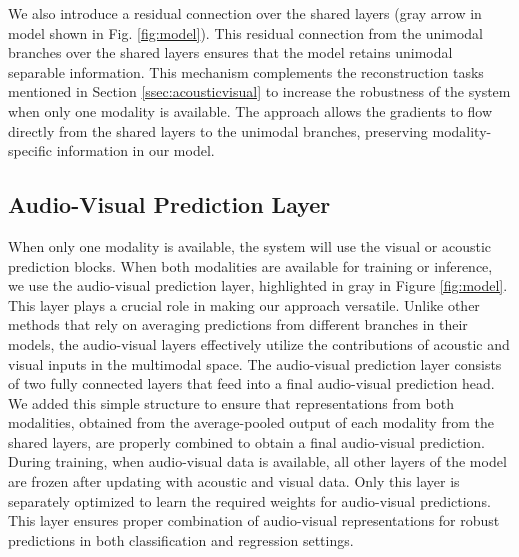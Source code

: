 \documentclass{article}
\begin{document}
We also introduce a residual connection over the shared layers (gray arrow in model  shown in Fig. \ref{fig:model}). This residual connection from the unimodal branches over the shared layers ensures that the model retains unimodal separable information. This mechanism complements the reconstruction tasks mentioned in Section \ref{ssec:acousticvisual} to increase the robustness of the system when only one modality is available. The approach allows the gradients to flow directly from the shared layers to the unimodal branches, preserving modality-specific information in our model.

\subsection{Audio-Visual Prediction Layer}
\label{ssec:AudiovisualModel}

When only one modality is available, the system will use the visual or acoustic prediction blocks. When both modalities are available for training or inference, we use the audio-visual prediction layer, highlighted in gray in Figure \ref{fig:model}. This layer plays a crucial role in making our approach versatile. Unlike other methods that rely on averaging predictions from different branches in their models, the audio-visual layers effectively utilize the contributions of acoustic and visual inputs in the multimodal space. The audio-visual prediction layer consists of two fully connected layers that feed into a final audio-visual prediction head. We added this simple structure to ensure that representations from both modalities, obtained from the average-pooled output of each modality from the shared layers, are properly combined to obtain a final audio-visual prediction. During training, when audio-visual data is available, all other layers of the model are frozen after updating with acoustic and visual data. Only this layer is separately optimized to learn the required weights for audio-visual predictions. This layer ensures proper combination of audio-visual representations for robust predictions in both classification and regression settings.
\end{document}
